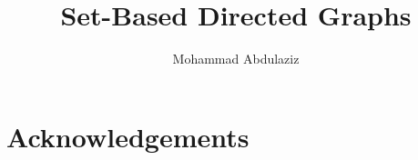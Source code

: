 \documentclass[11pt,a4paper]{article}
\begin{document}
\title{Set-Based Directed Graphs}
\author{Mohammad Abdulaziz}
\maketitle

\begin{abstract}
\end{abstract}


\section{Acknowledgements}





\end{document}
